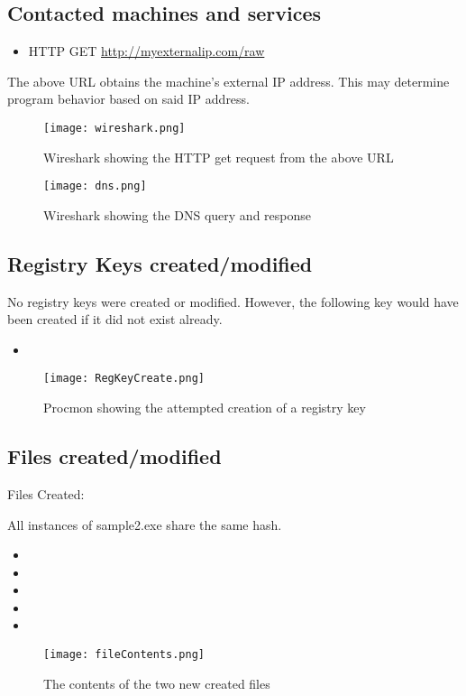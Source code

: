 \documentclass{article}
\begin{document}
    \subsection{Contacted machines and services}
    \begin{itemize}
        \item HTTP GET \url{http://myexternalip.com/raw}
    \end{itemize}
    The above URL obtains the machine's external IP address. This may determine program behavior based on said IP address.
    \begin{figure}[H]
        \texttt{[image: wireshark.png]}
        \caption{Wireshark showing the HTTP get request from the above URL }
    \end{figure}
    \begin{figure}[H]
        \texttt{[image: dns.png]}
        \label{dns}
        \caption{Wireshark showing the DNS query and response }
    \end{figure}

    \subsection{Registry Keys created/modified}
    No registry keys were created or modified. However, the following key would have been created if it did not exist already.
    \begin{itemize}
        \item {}
    \end{itemize}
    \begin{figure}[H]
        \texttt{[image: RegKeyCreate.png]}
        \caption{Procmon showing the attempted creation of a registry key}
    \end{figure}

    \subsection{Files created/modified}
    Files Created:


    All instances of sample2.exe share the same hash.
    \begin{itemize}
        \item {}
        \item {}
        \item {}
        \item {}
        \item {}
    \end{itemize}
    \begin{figure}[H]
        \texttt{[image: fileContents.png]}
        \caption{The contents of the two new created files}
    \end{figure}
\end{document}
